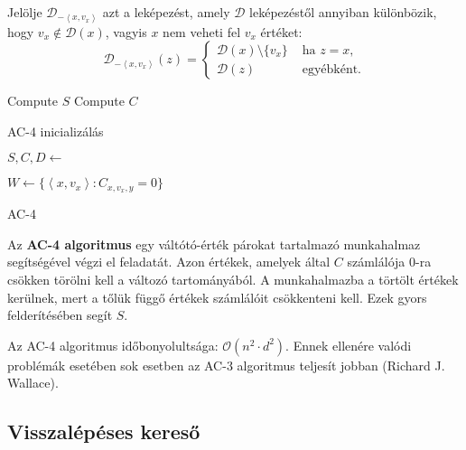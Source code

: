 Jelölje $\mathcal{D}_{-\left<x, v_x \right>}$ azt a leképezést, amely
$\mathcal{D}$ leképezéstől annyiban különbözik, hogy $v_x \not\in
\mathcal{D}(x)$, vagyis $x$ nem veheti fel $v_x$ értéket: \[
    \mathcal{D}_{-\left<x, v_x \right>}(z) =
    \begin{cases}
        \mathcal{D}(x)\setminus \{v_x\} & \text{ ha } z=x,\\
        \mathcal{D}(z) & \text{ egyébként.}
    \end{cases}
\]

\begin{algorithm}[H]
    \DontPrintSemicolon
    {
        Compute $S$ \;
        Compute $C$ \;
        \;
    }
    \caption{AC-4 inicializálás}
\end{algorithm}

\begin{algorithm}[H]
    \DontPrintSemicolon
    {
        $S, C, D \gets$  \;

        $W \gets \{\left<x, v_x \right> : C_{x,v_x,y} = 0\} $

        \;
    }
    \caption{AC-4}
\end{algorithm}

Az {\bf AC-4 algoritmus} egy váltótó-érték párokat tartalmazó munkahalmaz
segítségével végzi el feladatát. Azon értékek, amelyek által $C$ számlálója $0$-ra
csökken törölni kell a változó tartományából. A munkahalmazba a törtölt értékek
kerülnek, mert a tőlük függő értékek számlálóit csökkenteni kell. Ezek gyors
felderítésében segít $S$.

\begin{megjegyzes}
    Az AC-4 algoritmus időbonyolultsága: $\mathcal{O}(n^2 \cdot d^2)$. Ennek ellenére valódi
    problémák esetében sok esetben az AC-3 algoritmus teljesít jobban (Richard
    J.  Wallace).
\end{megjegyzes}

\subsection{Visszalépéses kereső}
